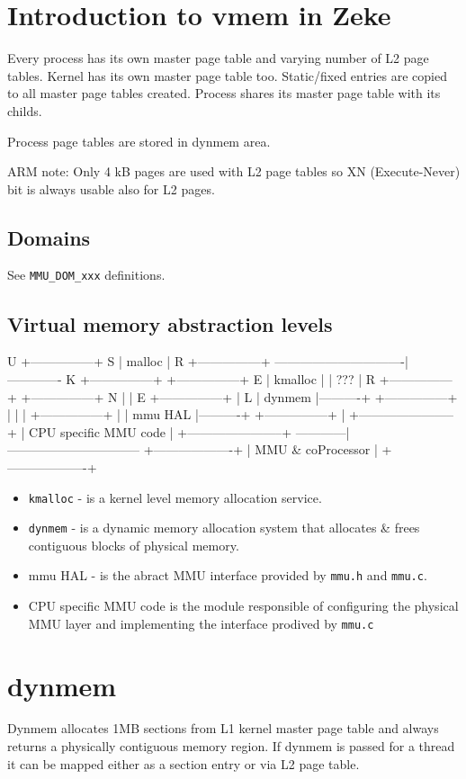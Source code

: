 \section{Introduction to vmem in Zeke}

Every process has its own master page table and varying number of L2 page
tables. Kernel has its own master page table too. Static/fixed entries are
copied to all master page tables created. Process shares its master page
table with its childs.

Process page tables are stored in dynmem area.

ARM note: Only 4 kB pages are used with L2 page tables so XN (Execute-Never) bit
is always usable also for L2 pages.

\subsection{Domains}

See \verb+MMU_DOM_xxx+ definitions.

\subsection{Virtual memory abstraction levels}


    U                      +---------------+
    S                      |    malloc     |
    R                      +---------------+
    -------------------------------|-------------
    K   +---------------+  +---------------+
    E   |    kmalloc    |  |      ???      |
    R   +---------------+  +---------------+
    N           |                  |
    E   +---------------+          |
    L   |    dynmem     |----------+
        +---------------+          |
                |                  |
        +---------------+          |
        |    mmu HAL    |----------+
        +---------------+
                |
        +-----------------------+
        | CPU specific MMU code |
        +-----------------------+
    ------------|--------------------------------
        +-------------------+
        | MMU & coProcessor |
        +-------------------+


\begin{itemize}
  \item \verb+kmalloc+ - is a kernel level memory allocation service.
  \item \verb+dynmem+ - is a dynamic memory allocation system that allocates & frees
        contiguous blocks of physical memory.
  \item  mmu HAL - is the abract MMU interface provided by \verb+mmu.h+
         and \verb+mmu.c+.
  \item CPU specific MMU code is the module responsible of configuring the
        physical MMU layer and implementing the interface prodived by
        \verb+mmu.c+
\end{itemize}


\section{dynmem}

Dynmem allocates 1MB sections from L1 kernel master page table and always
returns a physically contiguous memory region. If dynmem is passed for a thread
it can be mapped either as a section entry or via L2 page table.

